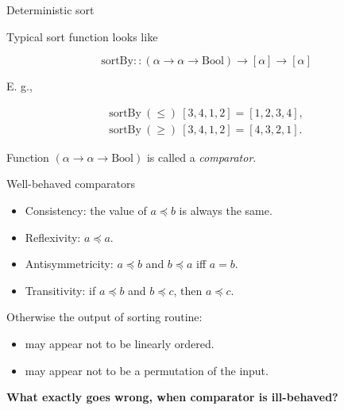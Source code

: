 \documentclass[handout]{beamer}
\begin{document}
\begin{frame}{Deterministic sort}

Typical sort function looks like

\begin{equation*}
\text{sortBy} :: (\alpha \to \alpha \to \text{Bool})
\to [\alpha]
\to [\alpha]
\end{equation*}

E. g.,

\vspace{-4ex}

\begin{align*}
\text{sortBy} ~ (\le) ~ [3,4,1,2] = [1,2,3,4], \\
\text{sortBy} ~ (\ge) ~ [3,4,1,2] = [4,3,2,1].
\end{align*}

Function $(\alpha \to \alpha \to \text{Bool})$ is called a {\em comparator}.

\end{frame}

\begin{frame}{Well-behaved comparators}
\begin{itemize}

\item Consistency: the value of $ a \preceq b $ is always the same.

\item Reflexivity: $a \preceq a$.

\item Antisymmetricity: $a \preceq b$ and $b \preceq a$ iff $a = b$.

\item Transitivity: if $a \preceq b$ and $b \preceq c$, then $a \preceq c$.
\end{itemize}

\bigskip

Otherwise the output of sorting routine:

\begin{itemize}

\item may appear not to be linearly ordered.

\item may appear not to be a permutation of the input.

\end{itemize}

\bigskip

\centerline{\bf What exactly goes wrong, when comparator is ill-behaved?}

\end{frame}
\end{document}
